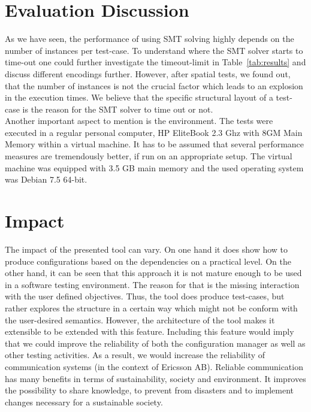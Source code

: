 \section{Evaluation Discussion}\label{sec:eval-discussion}

As we have seen, the performance of using SMT solving highly depends on the number of instances per test-case. To understand where the SMT solver starts to time-out one could further investigate the timeout-limit in Table~\ref{tab:results} and discuss different encodings further. However, after spatial tests, we found out, that the number of instances is not the crucial factor which leads to an explosion in the execution times. We believe that the specific structural layout of a test-case is the reason for the SMT solver to time out or not. \\

Another important aspect to mention is the environment. The tests were executed in a regular personal computer, HP EliteBook 2.3 Ghz with 8GM Main Memory within a virtual machine. It has to be assumed that several performance measures are tremendously better, if run on an appropriate setup. The virtual machine was equipped with 3.5 GB main memory and the used operating system was Debian 7.5 64-bit. 

\section{Impact}\label{sec:impact}

The impact of the presented tool can vary. On one hand it does show how to produce configurations based on the dependencies on a practical level. On the other hand, it can be seen that this approach it is not mature enough to be used in a software testing environment. The reason for that is the missing interaction with the user defined objectives. Thus, the tool does produce test-cases, but rather explores the structure in a certain way which might not be conform with the user-desired semantics. However, the architecture of the tool makes it extensible to be extended with this feature. Including this feature would imply that we could improve the reliability of both the configuration manager as well as other testing activities. As a result, we would increase the reliability of communication systems (in the context of Ericsson AB). Reliable communication has many benefits in terms of sustainability, society and environment. It improves the possibility to share knowledge, to prevent from disasters and to implement changes necessary for a sustainable society.


